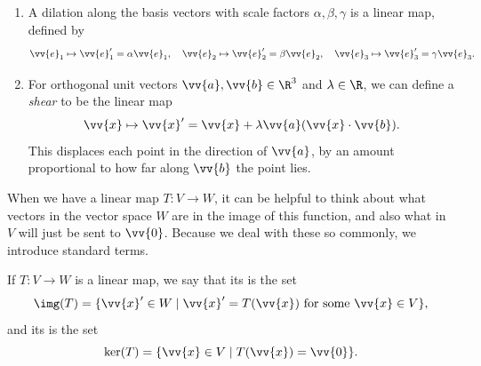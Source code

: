 \begin{example}
\begin{enumerate}[label=(\roman*)]
        \begin{center}
        \end{center}
    \item A dilation along the basis vectors with scale factors $\alpha, \beta, \gamma$ is a linear map, defined by
    $$
    \vv{e}_1 \mapsto \vv{e}_1' = \alpha \vv{e}_1, \quad \vv{e}_2 \mapsto \vv{e}_2' = \beta \vv{e}_2, \quad \vv{e}_3 \mapsto \vv{e}_3' = \gamma \vv{e}_3.
    $$
    \item For orthogonal unit vectors $\vv{a}, \vv{b} \in \R^3$ and $\lambda \in \R$, we can define a \emph{shear} to be the linear map
    $$
      \vv{x} \mapsto \vv{x}' = \vv{x} + \lambda \vv{a} (\vv{x} \cdot \vv{b}).
    $$
    This displaces each point in the direction of $\vv{a}$, by an amount proportional to how far along $\vv{b}$ the point lies.
\end{enumerate}
\end{example}

When we have a linear map $T: V \rightarrow W$, it can be helpful to think about what vectors in the vector space $W$ are in the image of this function, and also what in $V$ will just be sent to $\vv{0}$. Because we deal with these so commonly, we introduce standard terms.

\begin{definition}
    If $T: V \rightarrow W$ is a linear map, we say that its  is the set
    $$
    \img(T) = \{ \vv{x}' \in W \mid \vv{x}' = T(\vv{x}) \text{ for some } \vv{x} \in V\},
    $$ 
    and its  is the set
    $$
    \ker (T) = \{ \vv{x} \in V \mid T(\vv{x}) = \vv{0}\}.
    $$
\end{definition}

